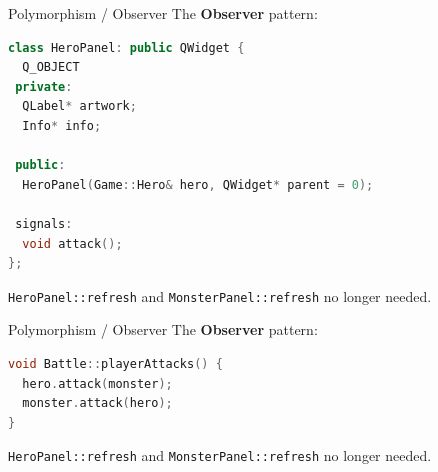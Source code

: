 \documentclass[11pt]{beamer}
\renewcommand{\emph}[1]{\textbf{#1}}
\begin{document}
\begin{frame}[fragile]{Polymorphism / Observer}
 The \emph{Observer} pattern:

 \begin{lstlisting}[language=C++]
class HeroPanel: public QWidget {
  Q_OBJECT
 private:
  QLabel* artwork;
  Info* info;
  
 public:
  HeroPanel(Game::Hero& hero, QWidget* parent = 0);
  
 signals:
  void attack();
};
\end{lstlisting}

\texttt{HeroPanel::refresh} and \texttt{MonsterPanel::refresh} no longer needed.
\end{frame}


\begin{frame}[fragile]{Polymorphism / Observer}
 The \emph{Observer} pattern:

 \begin{lstlisting}[language=C++]
void Battle::playerAttacks() {
  hero.attack(monster);
  monster.attack(hero);
}
\end{lstlisting}

\texttt{HeroPanel::refresh} and \texttt{MonsterPanel::refresh} no longer needed.
\end{frame}
\end{document}
